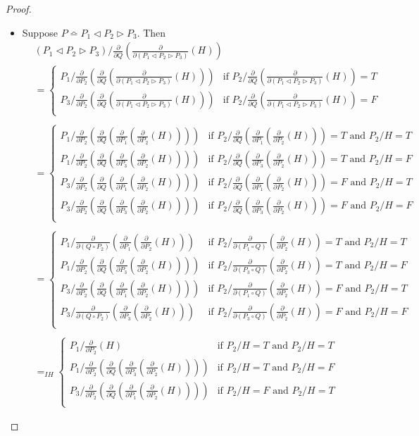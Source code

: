 \documentclass[a4paper,twoside,openright]{report}
\newcommand{\dd}[1]{\frac{\partial}{\partial #1}}
\newcommand{\syn}{\bumpeq}
\newcommand{\lef}{\ensuremath{\triangleleft}}
\newcommand{\rig}{\ensuremath{\triangleright}}
\begin{document}
\begin{proof}
\begin{itemize}
\item Suppose $P\syn P_1\lef P_2\rig P_3$. Then
\begin{align*}
&(P_1\lef P_2\rig P_3)/\dd Q(\dd{(P_1\lef P_2\rig P_3)}(H))\\
&=\begin{cases}
P_1/\dd{P_2}(\dd Q(\dd{(P_1\lef P_2\rig P_3)}(H))) & \text{if $P_2/\dd Q(\dd{(P_1\lef P_2\rig P_3)}(H))=T$}\\
P_3/\dd{P_2}(\dd Q(\dd{(P_1\lef P_2\rig P_3)}(H))) & \text{if $P_2/\dd Q(\dd{(P_1\lef P_2\rig P_3)}(H))=F$}\\
\end{cases}\\\\
&=\begin{cases}
P_1/\dd{P_2}(\dd Q(\dd{P_1}(\dd{P_2}(H)))) & \text{if $P_2/\dd Q(\dd{P_1}(\dd{P_2}(H)))=T$ and $P_2/H=T$}\\
P_1/\dd{P_2}(\dd Q(\dd{P_3}(\dd{P_2}(H)))) & \text{if $P_2/\dd Q(\dd{P_3}(\dd{P_2}(H)))=T$ and $P_2/H=F$}\\
P_3/\dd{P_2}(\dd Q(\dd{P_1}(\dd{P_2}(H)))) & \text{if $P_2/\dd Q(\dd{P_1}(\dd{P_2}(H)))=F$ and $P_2/H=T$}\\
P_3/\dd{P_2}(\dd Q(\dd{P_3}(\dd{P_2}(H)))) & \text{if $P_2/\dd Q(\dd{P_3}(\dd{P_2}(H)))=F$ and $P_2/H=F$}\\
\end{cases}\\\\
&=\begin{cases}
P_1/\dd{(Q\circ P_2)}(\dd{P_1}(\dd{P_2}(H))) & \text{if $P_2/\dd{(P_1\circ Q)}(\dd{P_2}(H))=T$ and $P_2/H=T$}\\
P_1/\dd{P_2}(\dd Q(\dd{P_3}(\dd{P_2}(H)))) & \text{if $P_2/\dd{(P_3\circ Q)}(\dd{P_2}(H))=T$ and $P_2/H=F$}\\
P_3/\dd{P_2}(\dd Q(\dd{P_1}(\dd{P_2}(H)))) & \text{if $P_2/\dd{(P_1\circ Q)}(\dd{P_2}(H))=F$ and $P_2/H=T$}\\
P_3/\dd{(Q\circ P_2)}(\dd{P_3}(\dd{P_2}(H))) & \text{if $P_2/\dd{(P_3\circ Q)}(\dd{P_2}(H))=F$ and $P_2/H=F$}\\
\end{cases}\\\\
&=_{IH}\begin{cases}
P_1/\dd{P_2}(H) & \text{if $P_2/H=T$ and $P_2/H=T$}\\
P_1/\dd{P_2}(\dd Q(\dd{P_3}(\dd{P_2}(H)))) & \text{if $P_2/H=T$ and $P_2/H=F$}\\
P_3/\dd{P_2}(\dd Q(\dd{P_1}(\dd{P_2}(H)))) & \text{if $P_2/H=F$ and $P_2/H=T$}\\

\end{cases}
\end{align*}
\end{itemize}
\end{proof}
\end{document}
